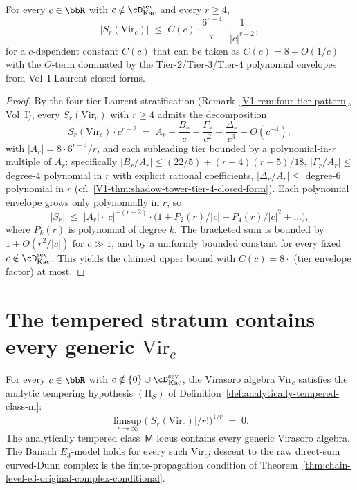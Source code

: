 \begin{proposition}
\label{prop:virasoro-s-r-upper-bound}
For every $c \in \bbR$ with
$c \notin \cD^{\mathrm{sev}}_{\mathrm{Kac}}$ and every $r \ge 4$,
\[
 \lvert S_r(\mathrm{Vir}_c) \rvert
 \;\le\;
 C(c) \cdot \frac{6^{r - 4}}{r}
 \cdot
 \frac{1}{\lvert c \rvert^{r - 2}},
\]
for a $c$-dependent constant $C(c)$ that can be taken as
$C(c) = 8 + O(1/c)$ with the $O$-term dominated by the
Tier-2/Tier-3/Tier-4 polynomial envelopes from Vol~I
Laurent closed forms.
\end{proposition}

\begin{proof}
By the four-tier Laurent stratification
(Remark~\ref{V1-rem:four-tier-pattern}, Vol~I), every $S_r(\mathrm{Vir}_c)$
with $r \ge 4$ admits the decomposition
\[
 S_r(\mathrm{Vir}_c) \cdot c^{r-2}
 \;=\; A_r + \frac{B_r}{c} + \frac{\Gamma_r}{c^2} + \frac{\Delta_r}{c^3}
 + O(c^{-4}),
\]
with $\lvert A_r \rvert = 8 \cdot 6^{r-4} / r$, and each subleading
tier bounded by a polynomial-in-$r$ multiple of $A_r$: specifically
$\lvert B_r / A_r \rvert \le (22/5) + (r-4)(r-5)/18$,
$\lvert \Gamma_r / A_r \rvert \le$ degree-$4$ polynomial in $r$ with
explicit rational coefficients,
$\lvert \Delta_r / A_r \rvert \le$ degree-$6$ polynomial in $r$
(cf.\ \ref{V1-thm:shadow-tower-tier-4-closed-form}). Each polynomial
envelope grows only polynomially in $r$, so
\[
 \lvert S_r \rvert
 \;\le\;
 \lvert A_r \rvert \cdot \lvert c \rvert^{-(r-2)}
 \cdot \bigl( 1 + P_2(r) / \lvert c \rvert
 + P_4(r) / \lvert c \rvert^2 + \ldots \bigr),
\]
where $P_k(r)$ is polynomial of degree $k$. The bracketed sum is
bounded by $1 + O(r^2 / \lvert c \rvert)$ for $c \gg 1$, and by a
uniformly bounded constant for every fixed $c \notin
\cD^{\mathrm{sev}}_{\mathrm{Kac}}$. This yields the claimed upper
bound with $C(c) = 8 \cdot$ (tier envelope factor) at most.
\end{proof}

\section{The tempered stratum contains every generic $\mathrm{Vir}_c$}
\label{sec:tempered-stratum-virasoro}

\begin{theorem}
\label{thm:tempered-stratum-contains-virasoro}
For every $c \in \bbR$ with
$c \notin \{0\} \cup \cD^{\mathrm{sev}}_{\mathrm{Kac}}$, the Virasoro
algebra $\mathrm{Vir}_c$ satisfies the analytic tempering hypothesis
$(\mathrm{H}_S)$ of
Definition~\ref{def:analytically-tempered-class-m}:
\[
 \limsup_{r \to \infty}
 \bigl( \lvert S_r(\mathrm{Vir}_c) \rvert / r! \bigr)^{1/r}
 \;=\;
 0.
\]
The analytically tempered class~$\mathsf M$ locus contains every
generic Virasoro algebra. The Banach $E_3$-model holds for every such
$\mathrm{Vir}_c$; descent to the raw direct-sum curved-Dunn complex
is the finite-propagation condition of
Theorem~\ref{thm:chain-level-e3-original-complex-conditional}.
\end{theorem}

